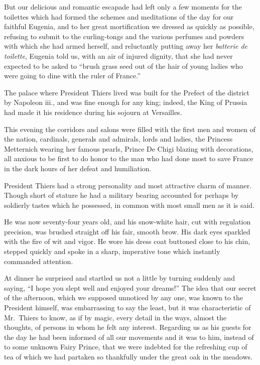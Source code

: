 \documentclass[12pt]{book}
\begin{document}
But our delicious and romantic escapade had left only a few moments for
the toilettes which had formed the schemes and meditations of the day for our
faithful Eugenia, and to her great mortification we dressed as quickly as possible,
refusing to submit to the curling‐tongs and the various perfumes and powders
with which she had armed herself, and reluctantly putting away her {\it batterie de
toilette}, Eugenia told us, with an air of injured dignity, that she had never expected
to be asked to “brush grass seed out of the hair of young ladies who were going
to dine with the ruler of France.”

The palace where President Thiers lived was built for the Prefect of the district
by Napoleon {\sc iii}., and was fine enough for any king; indeed, the King of Prussia
had made it his residence during his sojourn at Versailles.

This evening the corridors and salons were filled with the first men and
women of the nation, cardinals, generals and admirals, lords and ladies, the
Princess Metternich wearing her famous pearls, Prince De Chigi blazing with
decorations, all anxious to be first to do honor to the man who had done most to
save France in the dark hours of her defeat and humiliation.

President Thiers had a strong personality and most attractive charm of manner.
Though short of stature he had a military bearing accounted for perhaps by
soldierly tastes which he possessed, in common with most small men as it is said.

He was now seventy‐four years old, and his snow‐white hair, cut with regulation precision, was brushed straight off his fair, smooth brow. His dark eyes
sparkled with the fire of wit and vigor. He wore his dress coat buttoned close to
his chin, stepped quickly and spoke in a sharp, imperative tone which instantly
commanded attention.

At dinner he surprised and startled us not a little by turning suddenly and
saying, “I hope you slept well and enjoyed your dreams!” The idea that our secret
of the afternoon, which we supposed unnoticed by any one, was known to the
President himself, was embarrassing to say the least, but it was characteristic of
Mr.~Thiers to know, as if by magic, every detail in the ways, almost the thoughts,
of persons in whom he felt any interest. Regarding us as his guests for the day he
had been informed of all our movements and it was to him, instead of to some
unknown Fairy Prince, that we were indebted for the refreshing cup of tea of
which we had partaken so thankfully under the great oak in the meadows.
\end{document}

